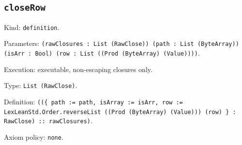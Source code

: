 \documentclass[11pt]{article}
\begin{document}
\subsection*{\texttt{closeRow}}
\noindent Kind: \texttt{definition}.\par
\noindent Parameters: \texttt{(rawClosures : List (RawClose)) (path : List (ByteArray)) (isArr : Bool) (row : List ((Prod (ByteArray) (Value))))}.\par
\noindent Execution: executable, non-escaping closures only.\par
\noindent Type: \texttt{List (RawClose)}.\par
\noindent Definition: \texttt{((\{ path := path, isArray := isArr, row := LexLeanStd.Order.reverseList ((Prod (ByteArray) (Value))) (row) \} : RawClose) :: rawClosures)}.\par
\noindent Axiom policy: \texttt{none}.\par
\end{document}
